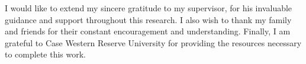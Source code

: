 
\noindent
I would like to extend my sincere gratitude to my supervisor, for his invaluable guidance and support throughout this research. I also wish to thank my family and friends for their constant encouragement and understanding. Finally, I am grateful to Case Western Reserve University for providing the resources necessary to complete this work.



